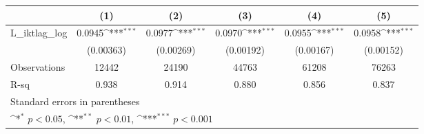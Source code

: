 {
\def\sym#1{\ifmmode^{#1}\else\(^{#1}\)\fi}
\begin{tabular}{l*{5}{c}}
\hline\hline
                &\multicolumn{1}{c}{(1)}         &\multicolumn{1}{c}{(2)}         &\multicolumn{1}{c}{(3)}         &\multicolumn{1}{c}{(4)}         &\multicolumn{1}{c}{(5)}         \\
\hline
L\_iktlag\_log    &   0.0945\sym{***}&   0.0977\sym{***}&   0.0970\sym{***}&   0.0955\sym{***}&   0.0958\sym{***}\\
                &(0.00363)         &(0.00269)         &(0.00192)         &(0.00167)         &(0.00152)         \\
\hline
Observations    &    12442         &    24190         &    44763         &    61208         &    76263         \\
R-sq            &    0.938         &    0.914         &    0.880         &    0.856         &    0.837         \\
\hline\hline
\multicolumn{6}{l}{\footnotesize Standard errors in parentheses}\\
\multicolumn{6}{l}{\footnotesize \sym{*} \(p<0.05\), \sym{**} \(p<0.01\), \sym{***} \(p<0.001\)}\\
\end{tabular}
}
